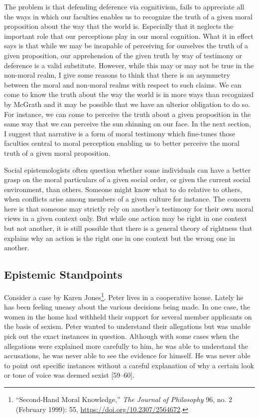 \documentclass[
  12pt,
]{book}
\theoremstyle{definition}
\theoremstyle{definition}
\theoremstyle{definition}
\theoremstyle{definition}
\theoremstyle{remark}
\begin{document}
The problem is that defending deference via cognitivism, fails to appreciate all the ways in which our faculties enables us to recognize the truth of a given moral proposition about the way that the world is. Especially that it neglects the important role that our perceptions play in our moral cognition. What it in effect says is that while we may be incapable of perceiving for ourselves the truth of a given proposition, our apprehension of the given truth by way of testimony or deference is a valid substitute. However, while this may or may not be true in the non-moral realm, I give some reasons to think that there is an asymmetry between the moral and non-moral realms with respect to such claims. We can come to know the truth about the way the world is in more ways than recognized by McGrath and it may be possible that we have an ulterior obligation to do so. For instance, we can come to perceive the truth about a given proposition in the same way that we can perceive the sun shinning on our face. In the next section, I suggest that narrative is a form of moral testimony which fine-tunes those faculties central to moral perception enabling us to better perceive the moral truth of a given moral proposition.

Social epistemologists often question whether some individuals can have a better grasp on the moral particulars of a given social order, or given the current social environment, than others. Someone might know what to do relative to others, when conflicts arise among members of a given culture for instance. The concern here is that someone may strictly rely on another's testimony for their own moral views in a given context only. But while one action may be right in one context but not another, it is still possible that there is a general theory of rightness that explains why an action is the right one in one context but the wrong one in another.

\subsection{Epistemic Standpoints}\label{epistemic-standpoints}

Consider a case by Karen Jones\footnote{{``Second-{Hand Moral Knowledge},''} \emph{The Journal of Philosophy} 96, no. 2 (February 1999): 55, \url{https://doi.org/10.2307/2564672}.}. Peter lives in a cooperative house. Lately he has been feeling uneasy about the various decisions being made. In one case, the women in the home had withheld their support for several member applicants on the basis of sexism. Peter wanted to understand their allegations but was unable pick out the exact instances in question. Although with some cases when the allegations were explained more carefully to him, he was able to understand the accusations, he was never able to see the evidence for himself. He was never able to point out specific instances without a careful explanation of why a certain look or tone of voice was deemed sexist {[}59--60{]}.
\end{document}
